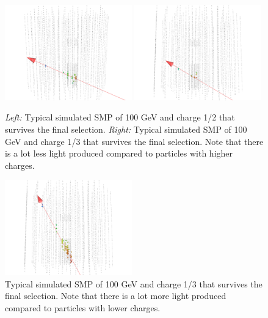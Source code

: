 \begin{appendices}
\begin{figure}
\centering
\includegraphics[width=0.49\textwidth]{appendix/img/FINAL_signal_m_100_ch1ovr2.png}
\includegraphics[width=0.49\textwidth]{appendix/img/FINAL_signal_m_100_ch1ovr3.png}
\caption{\textit{Left: }Typical simulated SMP of 100 GeV and charge 1/2 that survives the final selection. \textit{Right: }Typical simulated SMP of 100 GeV and charge 1/3 that survives the final selection. Note that there is a lot less light produced compared to particles with higher charges.}
\label{fig:final_4}
\end{figure}

\begin{figure}
\centering
\includegraphics[width=0.49\textwidth]{appendix/img/FINAL_signal_m_100_ch2ovr3.png}
\caption{Typical simulated SMP of 100 GeV and charge 1/3 that survives the final selection. Note that there is a lot more light produced compared to particles with lower charges.}
\label{fig:final_4}
\end{figure}




\end{appendices}